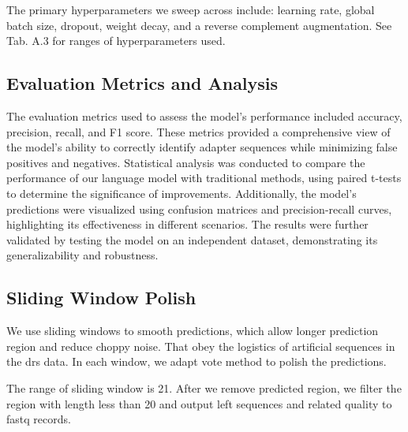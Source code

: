 \documentclass[pdflatex, sn-mathphys-num, lineno]{sn-jnl}%
\theoremstyle{thmstyleone}%
\theoremstyle{thmstyletwo}%
\theoremstyle{thmstylethree}%
\begin{document}
The primary hyperparameters we sweep across include: learning rate, global batch size, dropout, weight decay, and a reverse complement augmentation.
See Tab. A.3 for ranges of hyperparameters used.

\subsection{Evaluation Metrics and Analysis}

The evaluation metrics used to assess the model's performance included accuracy, precision, recall, and F1 score.
These metrics provided a comprehensive view of the model's ability to correctly identify adapter sequences while minimizing false positives and negatives.
Statistical analysis was conducted to compare the performance of our language model with traditional methods, using paired t-tests to determine the significance of improvements.
Additionally, the model's predictions were visualized using confusion matrices and precision-recall curves, highlighting its effectiveness in different scenarios.
The results were further validated by testing the model on an independent dataset, demonstrating its generalizability and robustness.

\subsection{Sliding Window Polish}

We use sliding windows to smooth predictions, which allow longer prediction region and reduce choppy noise.
That obey the logistics of artificial sequences in the \gls{drs} data.
In each window, we adapt vote method to polish the predictions.

The range of sliding window is \num{21}.
After we remove predicted region, we filter the region with length less than \num{20} and output left sequences and related quality to fastq records.



\end{document}
